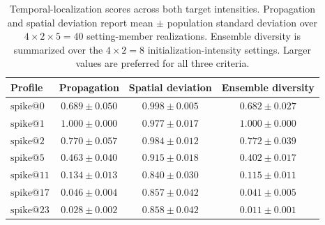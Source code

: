 \begin{table}[H]
    \centering
    \caption{
        Temporal-localization scores across both target intensities.
        Propagation and spatial deviation report mean $\pm$ population
        standard deviation over $4\times2\times5=40$ setting-member
        realizations. Ensemble diversity is summarized over the
        $4\times2=8$ initialization-intensity settings. Larger values are
        preferred for all three criteria.
    }
    \label{tab:t1-localization-summary}
    \begin{tabular}{lccc}
        \toprule
        Profile
        & Propagation
        & Spatial deviation
        & Ensemble diversity \\
        \midrule
        $\mathrm{spike@0}$
        & $0.689\pm0.050$
        & $\mathbf{0.998\pm0.005}$
        & $0.682\pm0.027$ \\

        $\mathrm{spike@1}$
        & $\mathbf{1.000\pm0.000}$
        & $0.977\pm0.017$
        & $\mathbf{1.000\pm0.000}$ \\

        $\mathrm{spike@2}$
        & $0.770\pm0.057$
        & $0.984\pm0.012$
        & $0.772\pm0.039$ \\

        $\mathrm{spike@5}$
        & $0.463\pm0.040$
        & $0.915\pm0.018$
        & $0.402\pm0.017$ \\

        $\mathrm{spike@11}$
        & $0.134\pm0.013$
        & $0.840\pm0.030$
        & $0.115\pm0.011$ \\

        $\mathrm{spike@17}$
        & $0.046\pm0.004$
        & $0.857\pm0.042$
        & $0.041\pm0.005$ \\

        $\mathrm{spike@23}$
        & $0.028\pm0.002$
        & $0.858\pm0.042$
        & $0.011\pm0.001$ \\
        \bottomrule
    \end{tabular}
\end{table}


